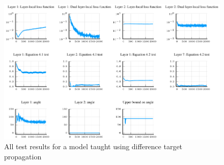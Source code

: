 \begin{figure}
	\centering
	\includegraphics[width=\textwidth]{images/difftargetprop-alltests/difftargetprop.pdf}
	\caption{All test results for a model taught using difference target propagation}\label{difftargetprop_tests}
\end{figure}
